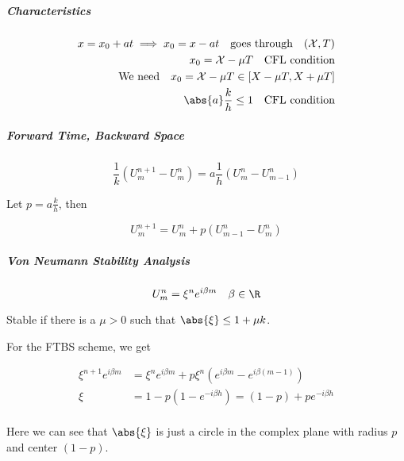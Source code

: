 \subparagraph{Characteristics}

\begin{align*}
  x = x_0 + at \implies x_0 = x - at \quad \text{goes through} \quad (\mathcal{X}, T) \\
  x_0 = \mathcal{X} - \mu T \quad \text{CFL condition}                                \\
  \text{We need} \quad x_0 = \mathcal{X} - \mu T \in [X - \mu T, X + \mu T]           \\
  \abs{a} \frac{k}{h} \leq 1 \quad \text{CFL condition}
\end{align*}

\subparagraph{Forward Time, Backward Space}
\[
  \frac{1}{k}\left( U_m^{n+1} - U_m^n \right) = a \frac{1}{h}\left( U_m^n - U_{m-1}^n \right)
\]

Let \(p = a \frac{k}{h}\), then

\[
  U_m^{n+1} = U_m^n + p(U_{m-1}^n - U_m^n)
\]

\subparagraph{Von Neumann Stability Analysis}
\[
  U_m^n = \xi^n e^{i\beta m} \quad \beta \in \R
\]

Stable if there is a \(\mu> 0\) such that \(\abs{\xi} \leq 1 + \mu k \).

For the FTBS scheme, we get

\begin{align*}
  \xi^{n+1} e^{i\beta m} & = \xi^n e^{i\beta m} + p\xi^n\left( e^{i\beta m} - e^{i\beta (m-1)} \right) \\
  \xi                    & = 1 - p(1 - e^{-i\beta h}) = (1 - p) + pe^{-i\beta h}                       \\
\end{align*}

Here we can see that \(\abs{\xi} \) is just a circle in the complex plane with radius \(p\) and center \((1-p)\).



